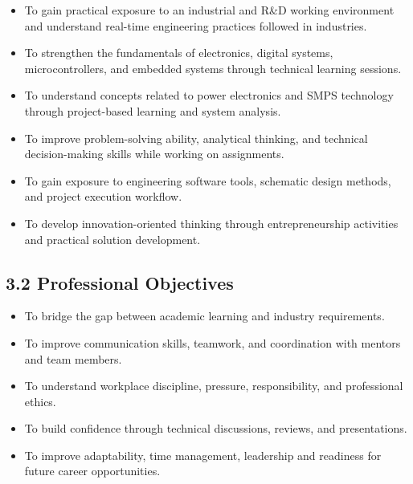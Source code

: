 \documentclass[10pt]{article}
\begin{document}
\begin{itemize}
\item To gain practical exposure to an industrial and R\&D working environment and understand real-time engineering practices followed in industries.

\item To strengthen the fundamentals of electronics, digital systems, microcontrollers, and embedded systems through technical learning sessions.

\item To understand concepts related to power electronics and SMPS technology through project-based learning and system analysis.

\item To improve problem-solving ability, analytical thinking, and technical decision-making skills while working on assignments.

\item To gain exposure to engineering software tools, schematic design methods, and project execution workflow.

\item To develop innovation-oriented thinking through entrepreneurship activities and practical solution development.



\end{itemize}

\subsection*{3.2 Professional Objectives}

\begin{itemize}
\item To bridge the gap between academic learning and industry requirements.

\item To improve communication skills, teamwork, and coordination with mentors and team members.

\item To understand workplace discipline, pressure, responsibility, and professional ethics.

\item To build confidence through technical discussions, reviews, and presentations.

\item To improve adaptability, time management, leadership and readiness for future career opportunities.
\end{itemize}
\end{document}
